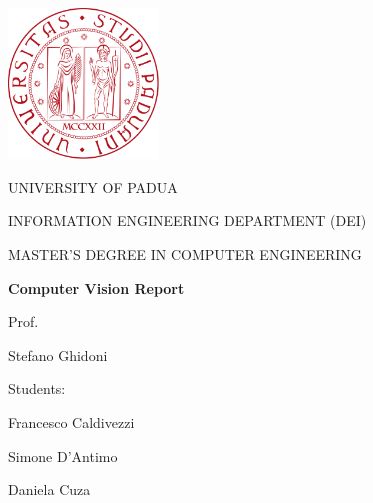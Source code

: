\begin{titlepage}
    \begin{center}
        \includegraphics[width=4cm]{images/logo_unipd/logo.png}
        
        \vspace*{1cm}
        \Large
        \textmd{UNIVERSITY OF PADUA}
        
        \vspace*{1cm}
        \large
        \textmd{INFORMATION ENGINEERING DEPARTMENT (DEI)}
                
        \vspace*{0.5cm}
        \large
        \textmd{MASTER'S DEGREE IN COMPUTER ENGINEERING} 
                
        \vspace*{1cm}
        \Huge
        \textbf{Computer Vision Report}
        
        
        \raggedright
        \vspace*{1cm}
        \large
        \textmd{Prof.}
        
        \textmd{Stefano Ghidoni}
        
        \raggedleft
        \vspace*{0.5cm}
        \large
        \textmd{Students:}
        
        \textmd{Francesco Caldivezzi}
        
        \textmd{Simone D'Antimo}
        
        \textmd{Daniela Cuza}
        
    \end{center}
\end{titlepage}